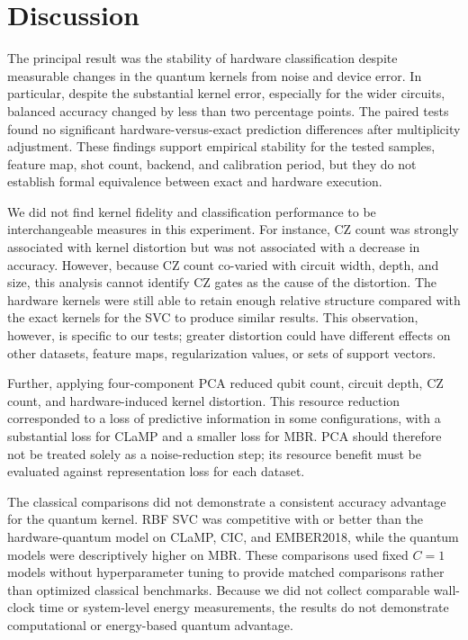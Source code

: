 \documentclass[letterpaper]{article} %
\begin{document}
\section{Discussion}

The principal result was the stability of hardware classification despite measurable changes in the quantum kernels from noise and device error. In particular, despite the substantial kernel error, especially for the wider circuits, balanced accuracy changed by less than two percentage points. The paired tests found no significant hardware-versus-exact prediction differences after multiplicity adjustment. These findings support empirical stability for the tested samples, feature map, shot count, backend, and calibration period, but they do not establish formal equivalence between exact and hardware execution.

We did not find kernel fidelity and classification performance to be interchangeable measures in this experiment. For instance, CZ count was strongly associated with kernel distortion but was not associated with a decrease in accuracy. However, because CZ count co-varied with circuit width, depth, and size, this analysis cannot identify CZ gates as the cause of the distortion. The hardware kernels were still able to retain enough relative structure compared with the exact kernels for the SVC to produce similar results. This observation, however, is specific to our tests; greater distortion could have different effects on other datasets, feature maps, regularization values, or sets of support vectors.

Further, applying four-component PCA reduced qubit count, circuit depth, CZ count, and hardware-induced kernel distortion. This resource reduction corresponded to a loss of predictive information in some configurations, with a substantial loss for CLaMP and a smaller loss for MBR. PCA should therefore not be treated solely as a noise-reduction step; its resource benefit must be evaluated against representation loss for each dataset.

The classical comparisons did not demonstrate a consistent accuracy advantage for the quantum kernel. RBF SVC was competitive with or better than the hardware-quantum model on CLaMP, CIC, and EMBER2018, while the quantum models were descriptively higher on MBR. These comparisons used fixed $C=1$ models without hyperparameter tuning to provide matched comparisons rather than optimized classical benchmarks. Because we did not collect comparable wall-clock time or system-level energy measurements, the results do not demonstrate computational or energy-based quantum advantage.
\end{document}
